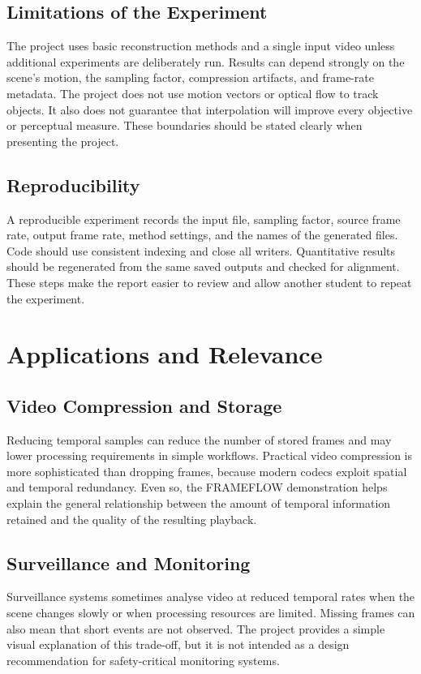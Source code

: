 \documentclass[12pt,a4paper,oneside]{report}
\begin{document}
\section{Limitations of the Experiment}
The project uses basic reconstruction methods and a single input video unless additional experiments are deliberately run. Results can depend strongly on the scene's motion, the sampling factor, compression artifacts, and frame-rate metadata. The project does not use motion vectors or optical flow to track objects. It also does not guarantee that interpolation will improve every objective or perceptual measure. These boundaries should be stated clearly when presenting the project.

\section{Reproducibility}
A reproducible experiment records the input file, sampling factor, source frame rate, output frame rate, method settings, and the names of the generated files. Code should use consistent indexing and close all writers. Quantitative results should be regenerated from the same saved outputs and checked for alignment. These steps make the report easier to review and allow another student to repeat the experiment.

\chapter{Applications and Relevance}
\section{Video Compression and Storage}
Reducing temporal samples can reduce the number of stored frames and may lower processing requirements in simple workflows. Practical video compression is more sophisticated than dropping frames, because modern codecs exploit spatial and temporal redundancy. Even so, the FRAMEFLOW demonstration helps explain the general relationship between the amount of temporal information retained and the quality of the resulting playback.

\section{Surveillance and Monitoring}
Surveillance systems sometimes analyse video at reduced temporal rates when the scene changes slowly or when processing resources are limited. Missing frames can also mean that short events are not observed. The project provides a simple visual explanation of this trade-off, but it is not intended as a design recommendation for safety-critical monitoring systems.
\end{document}
